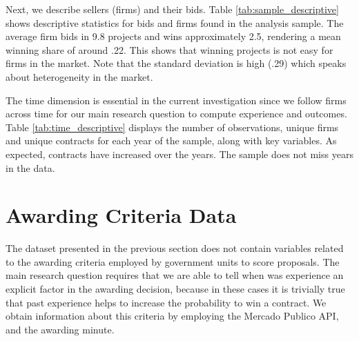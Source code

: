 


Next, we describe sellers (firms) and their bids. Table \ref{tab:sample_descriptive} shows descriptive statistics for bids and firms found in the analysis sample. The average firm bids in 9.8 projects and wins approximately 2.5, rendering a mean winning share of around .22. This shows that winning projects is not easy for firms in the market. Note that the standard deviation is high (.29) which speaks about heterogeneity in the market.



The time dimension is essential in the current investigation since we follow firms across time for our main research question to compute experience and outcomes. Table \ref{tab:time_descriptive} displays the number of observations, unique firms and unique contracts for each year of the sample, along with key variables. As expected, contracts have increased over the years. The sample does not miss years in the data.





\section{Awarding Criteria Data}
The dataset presented in the previous section does not contain variables related to the awarding criteria employed by government units to score proposals. The main research question requires that we are able to tell when was experience an explicit factor in the awarding decision, because in these cases it is trivially true that past experience helps to increase the probability to win a contract. We obtain information about this criteria by employing the Mercado Publico API, and the awarding minute.

